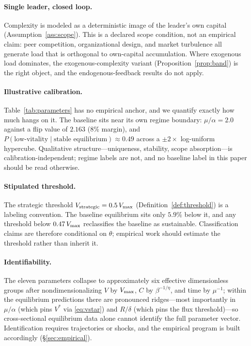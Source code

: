 \paragraph{Single leader, closed loop.} Complexity is modeled as a
deterministic image of the leader's own capital
(Assumption~\ref{ass:scope}). This is a declared scope condition, not an
empirical claim: peer competition, organizational design, and market
turbulence all generate load that is orthogonal to own-capital
accumulation. Where exogenous load dominates, the exogenous-complexity
variant (Proposition~\ref{prop:band}) is the right object, and the
endogenous-feedback results do not apply.

\paragraph{Illustrative calibration.} Table~\ref{tab:parameters} has no
empirical anchor, and we quantify exactly how much hangs on it. The
baseline sits near its own regime boundary: $\mu/\alpha=2.0$ against a
flip value of $2.163$ ($8\%$ margin), and
$P(\text{low-vitality}\mid\text{stable equilibrium})\approx0.49$ across a
$\pm2\times$ log-uniform hypercube. Qualitative structure---uniqueness,
stability, scope absorption---is calibration-independent; regime labels
are not, and no baseline label in this paper should be read otherwise.

\paragraph{Stipulated threshold.} The strategic threshold
$V_{\mathrm{strategic}}=0.5\,V_{\max}$ (Definition~\ref{def:threshold}) is a labeling
convention. The baseline equilibrium sits only $5.9\%$ below it, and any
threshold below $0.47\,V_{\max}$ reclassifies the baseline as sustainable.
Classification claims are therefore conditional on $\theta$; empirical
work should estimate the threshold rather than inherit it.

\paragraph{Identifiability.} The eleven parameters collapse to
approximately six effective dimensionless groups after nondimensionalizing
$V$ by $V_{\max}$, $C$ by $\beta^{-1/\eta}$, and time by $\mu^{-1}$; within
the equilibrium predictions there are pronounced ridges---most importantly
in $\mu/\alpha$ (which pins $V^{*}$ via \eqref{eq:vstar}) and $R/\delta$
(which pins the flux threshold)---so cross-sectional equilibrium data
alone cannot identify the full parameter vector. Identification requires
trajectories or shocks, and the empirical program is built accordingly
(\S\ref{sec:empirical}).

